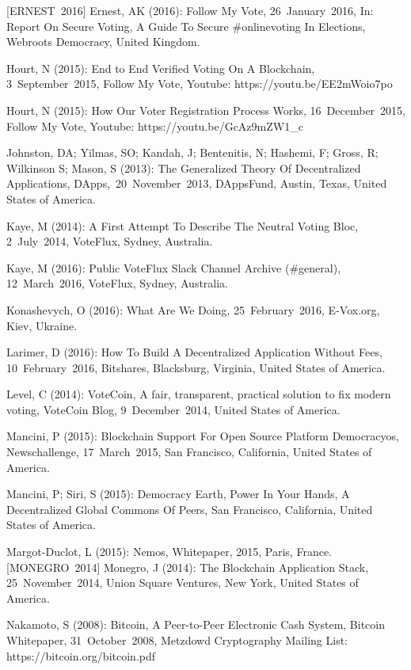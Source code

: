 [ERNEST~2016] Ernest, AK (2016): Follow My Vote, 26~January~2016, In: Report On Secure Voting, A Guide To Secure \#onlinevoting In Elections, Webroots Democracy, United Kingdom.\par
[HOURT~2015A] Hourt, N (2015): End to End Verified Voting On A Blockchain, 3~September~2015, Follow My Vote, Youtube: https://youtu.be/EE2mWoio7po\par
[HOURT~2015B] Hourt, N (2015): How Our Voter Registration Process Works, 16~December~2015, Follow My Vote, Youtube: https://youtu.be/GcAz9mZW1\_c\par
[JOHNSTON~et~al.~2013] Johnston, DA; Yilmas, SO; Kandah, J; Bentenitis, N; Hashemi, F; Gross, R; Wilkinson S; Mason, S (2013): The Generalized Theory Of Decentralized Applications, DApps,~20~November~2013, DAppsFund, Austin, Texas, United States of America.\par
[KAYE~2014] Kaye, M (2014): A First Attempt To Describe The Neutral Voting Bloc, 2~July~2014, VoteFlux, Sydney, Australia.\par
[KAYE~2016] Kaye, M (2016): Public VoteFlux Slack Channel Archive (\#general), 12~March~2016, VoteFlux, Sydney, Australia.\par
[KONASHEVYCH~2016] Konashevych, O (2016): What Are We Doing, 25~February~2016, E-Vox.org, Kiev, Ukraine.\par
[LARIMER~2016] Larimer, D (2016): How To Build A Decentralized Application Without Fees, 10~February~2016, Bitshares, Blacksburg, Virginia, United States of America.\par
[LEVEL~2014] Level, C (2014): VoteCoin, A fair, transparent, practical solution to fix modern voting, VoteCoin Blog, 9~December~2014, United States of America.\par
[MANCINI~2015] Mancini, P (2015): Blockchain Support For Open Source Platform Democracyos, Newschallenge, 17~March~2015, San Francisco, California, United States of America.\par
[MANCINI~et~al.~2015] Mancini, P; Siri, S (2015): Democracy Earth, Power In Your Hands, A Decentralized Global Commons Of Peers, San Francisco, California, United States of America.\par
[MARGOT-DUCLOT~2015] Margot-Duclot, L (2015): Nemos, Whitepaper, 2015, Paris, France.
[MONEGRO~2014] Monegro, J (2014): The Blockchain Application Stack, 25~November~2014, Union Square Ventures, New York, United States of America.\par
[NAKAMOTO~2008] Nakamoto, S (2008): Bitcoin, A Peer-to-Peer Electronic Cash System, Bitcoin Whitepaper, 31~October~2008, Metzdowd Cryptography Mailing List: https://bitcoin.org/bitcoin.pdf\par
